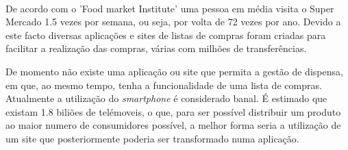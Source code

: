 \paragraph{}
De acordo com o 'Food market Institute' uma pessoa em média visita o Super Mercado 1.5 vezes por semana, ou seja, por volta de 72 vezes por ano. Devido a este facto diversas aplicações e sites de listas de compras foram criadas para facilitar a realização das compras, várias com milhões de transferências.
\par
De momento não existe uma aplicação ou site que permita a gestão de dispensa, em que, ao mesmo tempo, tenha a funcionalidade de uma lista de compras. Atualmente a utilização do \textit{smartphone} é considerado banal. É estimado que existam 1.8 biliões de telémoveis, o que, para ser possível distribuir um produto ao maior numero de consumidores possível, a melhor forma seria a utilização de um site que posteriormente poderia ser transformado numa aplicação.